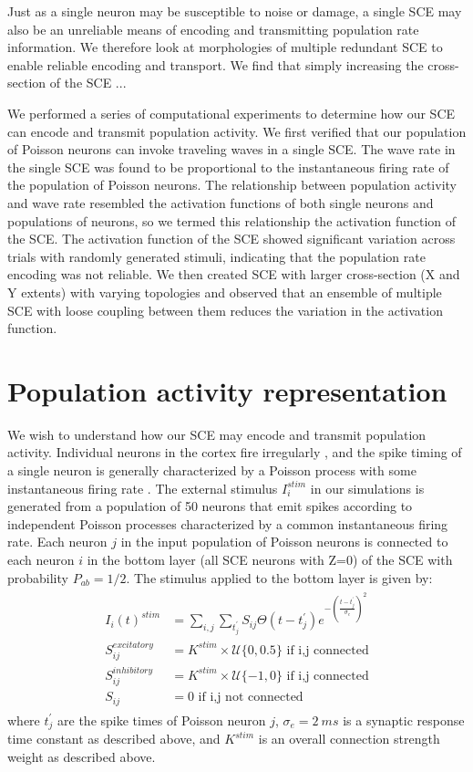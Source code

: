 Just as a single neuron may be susceptible to noise or damage, a single SCE may also be an unreliable means of encoding and transmitting population rate information.
We therefore look at morphologies of multiple redundant SCE to enable reliable encoding and transport.
We find that simply increasing the cross-section of the SCE ...

We performed a series of computational experiments to determine how our SCE can encode and transmit population activity.
We first verified that our population of Poisson neurons can invoke traveling waves in a single SCE.
The wave rate in the single SCE was found to be proportional to the instantaneous firing rate of the population of Poisson neurons.
The relationship between population activity and wave rate resembled the activation functions of both single neurons and populations of neurons, so we termed this relationship the activation function of the SCE.
The activation function of the SCE showed significant variation across trials with randomly generated stimuli, indicating that the population rate encoding was not reliable.
We then created SCE with larger cross-section (X and Y extents) with varying topologies and observed that an ensemble of multiple SCE with loose coupling between them reduces the variation in the activation function.

\section{Population activity representation}
We wish to understand how our SCE may encode and transmit population activity.
Individual neurons in the cortex fire irregularly \citep{Maimon2009}, and the spike timing of a single neuron is generally characterized by a Poisson process with some instantaneous firing rate \citep{Gerstein1964}.
The external stimulus $I_i^{stim}$ in our simulations is generated from a population of 50 neurons that emit spikes according to independent Poisson processes characterized by a common instantaneous firing rate.
Each neuron $j$ in the input population of Poisson neurons is connected to each neuron $i$ in the bottom layer (all SCE neurons with Z=0) of the SCE with probability $P_{ab} = 1/2$.
The stimulus applied to the bottom layer is given by:
\begin{align}
 \begin{split}
  I_i(t)^{stim} &= \sum_{i,j} \sum_{t^\prime_j} S_{ij}  \Theta(t-t^\prime_j)e^{-(\frac{t-t^\prime_j}{\sigma_e})^2}\\
  S_{ij}^{excitatory} &= K^{stim} \times \mathcal{U}\{0,0.5 \} \text{ if i,j connected}\\
  S_{ij}^{inhibitory} &= K^{stim} \times \mathcal{U}\{-1,0 \} \text{ if i,j connected}\\
  S_{ij} &= 0 \text{ if i,j not connected}
 \end{split}
\end{align}
where $t^\prime_j$ are the spike times of Poisson neuron $j$, $\sigma_e=2\ ms$ is a synaptic response time constant as described above, and $K^{stim}$ is an overall connection strength weight as described above.



